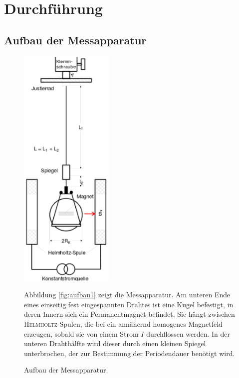 \newpage
\section{Durchführung}
\label{sec:Durchfuehrung}
\subsection{Aufbau der Messapparatur}
\begin{figure}
\begin{minipage}[l]{0.49\textwidth}
	\centering
	\includegraphics[width=0.4\textwidth]{Bilder/Aufbau1.pdf}
	\caption{Aufbau der Messapparatur. \cite{V102}}
	\label{fig:aufbau1}
\end{minipage}
\begin{minipage}[r]{0.49\textwidth}
	
Abbildung \ref{fig:aufbau1} zeigt die Messapparatur. 
Am unteren Ende eines einseitig fest eingespannten Drahtes ist eine Kugel befestigt, in deren Innern sich ein Permanentmagnet befindet. 
Sie hängt zwischen \textsc{Helmholtz}-Spulen, die bei ein annähernd homogenes Magnetfeld erzeugen, sobald sie von einem Strom $I$ durchflossen werden.
In der unteren Drahthälfte wird dieser durch einen kleinen Spiegel unterbrochen, der zur Bestimmung der Periodendauer benötigt wird.
\label{sec:durchfuehrung2}
\end{minipage}
\end{figure}
